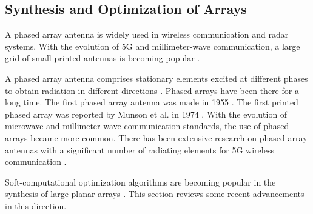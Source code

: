 \subsection{Synthesis and Optimization of Arrays} \label{c1sec_lit_surv}

A phased array antenna is widely used in wireless communication and radar systems. With the evolution of 5G and millimeter-wave communication, a large grid of small printed antennas is becoming popular \cite{5gmmwave, 5gmmwave_fr4}.

A phased array antenna comprises stationary elements excited at different phases to obtain radiation in different directions \cite{phasedArrayHandbook}. Phased arrays have been there for a long time. The first phased array antenna was made in 1955 \cite{phasedArray_russia}. The first printed phased array was reported by Munson et al. in 1974 \cite{txmPhasedArray}. With the evolution of microwave and millimeter-wave communication standards, the use of phased arrays became more common. There has been extensive research on phased array antennas with a significant number of radiating elements for 5G wireless communication \cite{mmarrayRrev}.

Soft-computational optimization algorithms are becoming popular in the synthesis of large planar arrays \cite{arrayTradeoffs}. This section reviews some recent advancements in this direction.

